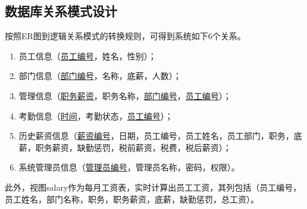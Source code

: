 \documentclass[withoutpreface,bwprint]{cumcmthesis} %
\begin{document}
\subsection{数据库关系模式设计}
按照ER图到逻辑关系模式的转换规则，可得到系统如下6个关系。
\begin{enumerate}
	\item 员工信息（\uline{员工编号}，姓名，性别）；
	\item 部门信息（\uline{部门编号}，名称，底薪，人数）；
	\item 管理信息（\uline{职务薪资}，职务名称，\uline{部门编号}，\uline{员工编号}）；
	\item 考勤信息（\uline{时间}，考勤状态，\uline{员工编号}）；
	\item 历史薪资信息（\uline{薪资编号}，日期，员工编号，员工姓名，员工部门，职务，底薪，职务薪资，缺勤惩罚，税前薪资，税费，税后薪资）；
	\item 系统管理员信息（\uline{管理员编号}，管理员名称，密码，权限）。
\end{enumerate}
此外，视图salary作为每月工资表，实时计算出员工工资，其列包括（员工编号，员工姓名，部门名称，职务，职务薪资，底薪，缺勤惩罚，总工资）。
\end{document}
